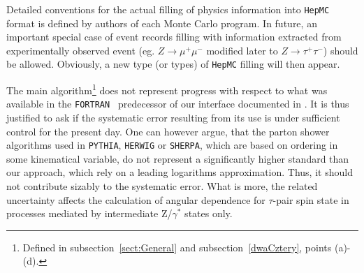 \documentclass[]{Tauola_interface_design}
\begin{document}
Detailed
conventions for the actual filling of physics information into {\tt HepMC} format
is defined by authors of each Monte Carlo program.
 In future,  an important special case of event records filling with
information extracted from experimentally observed event (eg. $Z\to \mu^+\mu^-$
 modified later to $Z\to \tau^+\tau^-$) should be allowed.
  Obviously, a new type (or types) of {\tt HepMC} filling will then appear.

The main algorithm\footnote{ Defined in subsection~\ref{sect:General} and subsection~\ref{dwaCztery}, points (a)-(d).}
 does not represent progress with respect to what was
available in the
{\tt FORTRAN } predecessor of our 
interface documented in \cite{Golonka:2003xt}. 
It is thus justified to ask if the systematic 
error resulting from its use
is under sufficient control for the present day. 
One can however argue, that
the parton shower algorithms used in {\tt PYTHIA}, {\tt HERWIG} or {\tt SHERPA},
which are
based on ordering in some kinematical variable, do not represent
a significantly higher standard than  our approach, which  
 rely on a leading logarithms approximation. Thus, it should not contribute 
sizably to the systematic error. What is more, the related uncertainty 
affects the calculation of
angular dependence for 
$\tau$-pair spin state in processes mediated by intermediate Z/$\gamma^*$
states only. 
\end{document}
